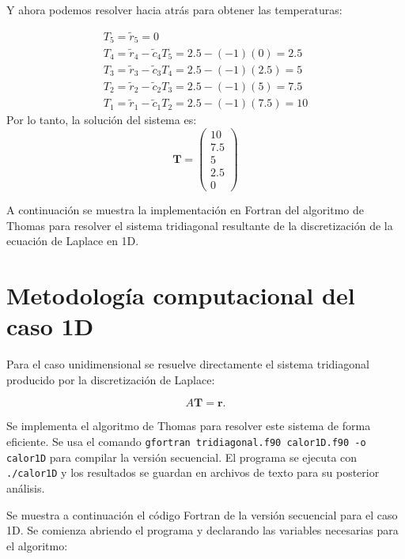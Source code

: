 \documentclass[11pt,a4paper]{article}
\begin{document}
Y ahora podemos resolver hacia atr\'as para obtener las temperaturas:

\begin{equation}
\begin{array}{l}
T_5 = \tilde{r}_5 = 0 \\
T_4 = \tilde{r}_4 - \tilde{c}_4 T_5 = 2\textrm{.}5 - (-1)(0) = 2\textrm{.}5 \\
T_3 = \tilde{r}_3 - \tilde{c}_3 T_4 = 2\textrm{.}5 - (-1)(2\textrm{.}5) = 5 \\
T_2 = \tilde{r}_2 - \tilde{c}_2 T_3 = 2\textrm{.}5 - (-1)(5) = 7\textrm{.}5 \\
T_1 = \tilde{r}_1 - \tilde{c}_1 T_2 = 2\textrm{.}5 - (-1)(7\textrm{.}5) = 10
\end{array}
\end{equation}
Por lo tanto, la soluci\'on del sistema es:
\begin{equation}
\mathbf{T} = \begin{pmatrix}
10 \\
7\textrm{.}5 \\
5 \\
2\textrm{.}5 \\
0
\end{pmatrix}
\end{equation}

A continuaci\'on se muestra la implementaci\'on en Fortran del algoritmo de 
Thomas para resolver el sistema tridiagonal resultante de la discretizaci\'on 
de la ecuaci\'on de Laplace en 1D.

\section{Metodolog\'ia computacional del caso 1D}

Para el caso unidimensional se resuelve directamente el sistema tridiagonal
producido por la discretizaci\'on de Laplace:

\begin{equation}
A\mathbf{T}=\mathbf{r}.
\end{equation}

Se implementa el algoritmo de Thomas para resolver este sistema de forma 
eficiente. Se usa el comando \verb|gfortran tridiagonal.f90 calor1D.f90 -o calor1D| 
para compilar la versi\'on secuencial. El programa se ejecuta con \verb|./calor1D| 
y los resultados se guardan en archivos de texto para su posterior an\'alisis.

\medskip{}

Se muestra a continuaci\'on el c\'odigo Fortran de la versi\'on secuencial 
para el caso 1D. Se comienza abriendo el programa y declarando las variables 
necesarias para el algoritmo:
\end{document}
